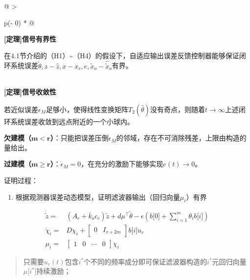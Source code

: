 \documentclass[
  12pt,
  a4paper
]{article}
\begin{document}
\begin{longtable}[]{@{}
  >{\raggedright\arraybackslash}p{}@{}}
\toprule\noalign{}
\begin{minipage}[b]{\linewidth}\raggedright
\textbf{{[}定理{]}信号有界性}

在4.1节介绍的（H1）\textasciitilde（H4）的假设下，自适应输出误差反馈控制器能够保证闭环系统误差\(\widetilde{\theta},z - \widehat{z},x - x_{r},e,{\widetilde{x}}_{o} - {\widehat{\widetilde{x}}}_{o}\)有界。
\end{minipage} \\
\midrule\noalign{}
\endhead
\bottomrule\noalign{}
\endlastfoot
\textbf{{[}定理{]}信号收敛性}

若近似误差\(\epsilon_{M}\)足够小，使得线性变换矩阵\(T_{2}\left( \widehat{\theta} \right)\)没有奇点，则随着\(t \rightarrow \infty\)上述闭环系统误差收敛到远点附近的一个小球内。

\textbf{欠建模（}\(\mathbf{m < r}\)\textbf{）}：只能把误差压倒\(\epsilon_{M}\)的邻域，存在不可消除残差，上限由构造的量给出。

\textbf{过建模（}\(\mathbf{m \geq r}\)\textbf{）}：\(\epsilon_{M} = 0\)，在充分的激励下能够实现\(e(t) \rightarrow 0\)。 \\
\begin{minipage}[t]{\linewidth}\raggedright
证明过程：

\begin{enumerate}
\def\labelenumi{\arabic{enumi}.}
\item
  根据观测器误差动态模型，证明滤波器输出（回归向量\(\mu_{i}\)）有界
\end{enumerate}

\[\begin{aligned}
\dot{\widetilde{z}} = & \left( A_{c} + {\overline{k}}_{o}c_{c} \right)\widetilde{z} + d\mu^{\top}\widetilde{\theta} - \epsilon\left( b\lbrack 0\rbrack + \sum_{i = 1}^{m}\theta_{i}b\lbrack i\rbrack \right) \\
{\dot{\chi}}_{i} = & D\chi_{i} + \begin{bmatrix}
0 & I_{v + 2m}
\end{bmatrix}b\lbrack i\rbrack u_{r} \\
\mu_{i} = & \begin{bmatrix}
1 & 0 & \cdots & 0
\end{bmatrix}\chi_{i}
\end{aligned}\]

\begin{quote}
只需要\(u_{r}(t)\)包含\(i^{*}\)个不同的频率成分即可保证滤波器构造的\(i^{*}\)元回归向量\(\mu\lbrack i^{*}\rbrack\)持续激励；


\end{quote}
\end{minipage}
\end{longtable}
\end{document}
